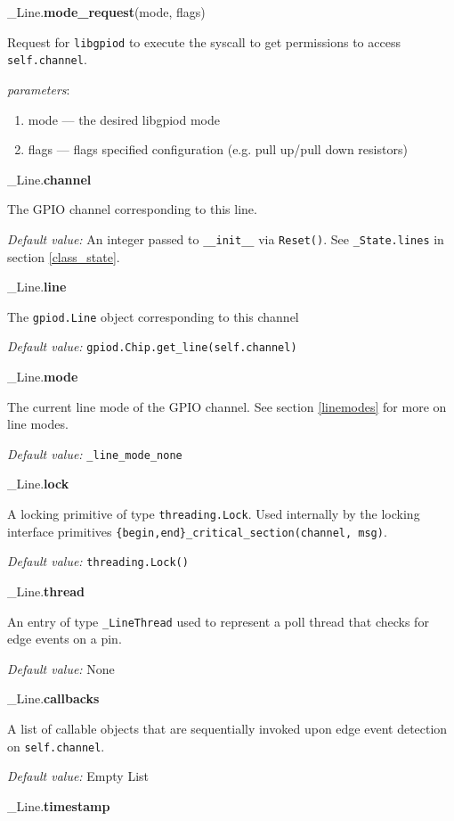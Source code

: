 \documentclass[12pt]{article}
\begin{document}
\noindent \_Line.\textbf{mode\_request}(mode, flags)

Request for \texttt{libgpiod} to execute the syscall to get permissions to access \texttt{self.channel}.

\textit{parameters}:
\begin{enumerate}
        \item mode --- the desired libgpiod mode
        \item flags --- flags specified configuration (e.g. pull up/pull down resistors)
\end{enumerate}

\noindent \_Line.\textbf{channel}

The GPIO channel corresponding to this line.

\textit{Default value:} An integer passed to \texttt{\_\_init\_\_} via \texttt{Reset()}. See \texttt{\_State.lines} in section \ref{class_state}.

\noindent \_Line.\textbf{line}

The \texttt{gpiod.Line} object corresponding to this channel

\textit{Default value:} \texttt{gpiod.Chip.get\_line(self.channel)}

\noindent \_Line.\textbf{mode}

The current line mode of the GPIO channel. See section \ref{linemodes} for more on line modes.

\textit{Default value:} \texttt{\_line\_mode\_none}

\noindent \_Line.\textbf{lock}

A locking primitive of type \texttt{threading.Lock}. Used internally by the locking interface primitives \texttt{\{begin,end\}\_critical\_section(channel, msg)}.

\textit{Default value:} \texttt{threading.Lock()}

\noindent \_Line.\textbf{thread}

An entry of type \texttt{\_LineThread} used to represent a poll thread that checks for edge events on a pin.

\textit{Default value:} None

\noindent \_Line.\textbf{callbacks}

A list of callable objects that are sequentially invoked upon edge event detection on \texttt{self.channel}.

\textit{Default value:} Empty List

\noindent \_Line.\textbf{timestamp}
\end{document}
